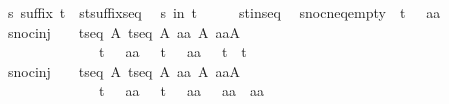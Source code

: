 \begin{isabellebody}
\ \ {\isachardoublequoteopen}s\ suffix\ t{\isachardoublequoteclose}\ {\isacharequal}{\isacharequal}\ {\isachardoublequoteopen}{\isacharparenleft}s{\isacharcomma}t{\isacharparenright}{\isacharcolon}suffixseq{\isachardoublequoteclose}\isanewline
\ \ {\isachardoublequoteopen}s\ in\ t{\isachardoublequoteclose}\ \ \ \ \ {\isacharequal}{\isacharequal}\ {\isachardoublequoteopen}{\isacharparenleft}s{\isacharcomma}t{\isacharparenright}{\isacharcolon}inseq{\isachardoublequoteclose}\isanewline
\isanewline
\isanewline
\isanewline
{}\isamarkupfalse%
\isanewline
\ \ snoc{\isacharunderscore}neq{\isacharunderscore}empty{\isacharcolon}\ {\isachardoublequoteopen}\ t\ {\isacharpercent}{\isacharampersand}{\isacharcircum}\ {\isacharpercent}{\isacharless}\ aa\ {\isacharpercent}{\isachargreater}\ {\isachartilde}{\isacharequal}\ \ {\isacharpercent}{\isacharless}{\isacharpercent}{\isachargreater}\ {\isachardoublequoteclose}\isanewline
\ \ snoc{\isacharunderscore}inj{}{\isacharcolon}\ \ \ {\isachardoublequoteopen}{\isacharbrackleft}{\isacharbar}\ t{\isacharcolon}seq\ A{\isacharsemicolon}\ t{\isacharprime}{\isacharcolon}seq\ A{\isacharsemicolon}\ aa{\isacharcolon}\ A{\isacharsemicolon}\ aa{\isacharprime}{\isacharcolon}A\ {\isacharbar}{\isacharbrackright}\ {\isacharequal}{\isacharequal}{\isachargreater}\isanewline
\ \ \ \ \ \ \ \ \ \ \ \ \ \ \ t\ {\isacharpercent}{\isacharampersand}{\isacharcircum}\ {\isacharpercent}{\isacharless}\ aa\ {\isacharpercent}{\isachargreater}\ {\isacharequal}\ t{\isacharprime}\ {\isacharpercent}{\isacharampersand}{\isacharcircum}\ {\isacharpercent}{\isacharless}\ aa{\isacharprime}\ {\isacharpercent}{\isachargreater}\ {\isacharequal}{\isacharequal}{\isachargreater}\ t\ {\isacharequal}\ t{\isacharprime}{\isachardoublequoteclose}\isanewline
\ \ snoc{\isacharunderscore}inj{}{\isacharcolon}\ \ \ {\isachardoublequoteopen}{\isacharbrackleft}{\isacharbar}\ t{\isacharcolon}seq\ A{\isacharsemicolon}\ t{\isacharprime}{\isacharcolon}seq\ A{\isacharsemicolon}\ aa{\isacharcolon}\ A{\isacharsemicolon}\ aa{\isacharprime}{\isacharcolon}A\ {\isacharbar}{\isacharbrackright}\ {\isacharequal}{\isacharequal}{\isachargreater}\isanewline
\ \ \ \ \ \ \ \ \ \ \ \ \ \ \ t\ {\isacharpercent}{\isacharampersand}{\isacharcircum}\ {\isacharpercent}{\isacharless}\ aa\ {\isacharpercent}{\isachargreater}\ {\isacharequal}\ t{\isacharprime}\ {\isacharpercent}{\isacharampersand}{\isacharcircum}\ {\isacharpercent}{\isacharless}\ aa{\isacharprime}\ {\isacharpercent}{\isachargreater}\ {\isacharequal}{\isacharequal}{\isachargreater}\ aa\ {\isacharequal}\ aa{\isacharprime}{\isachardoublequoteclose}\ \isanewline

\end{isabellebody}
